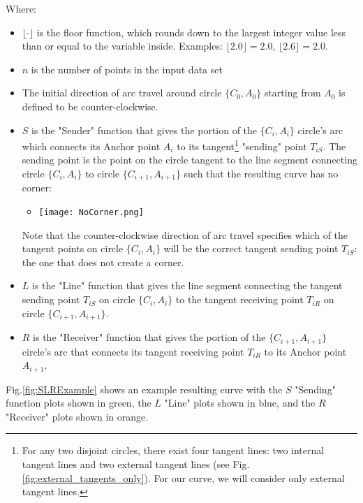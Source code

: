 \documentclass{article}
\begin{document}
Where:
\begin{itemize}
    \item $\lfloor \cdot \rfloor$ is the floor function, which rounds down to the largest integer value less than or equal to the variable inside. Examples: $\lfloor 2.0 \rfloor = 2.0$, $\lfloor 2.6 \rfloor = 2.0$.
    \item $n$ is the number of points in the input data set
    \item The initial direction of arc travel around circle $\{C_0, A_0\}$ starting from $A_0$ is defined to be counter-clockwise.
    \item $S$ is the "Sender" function that gives the portion of the $\{C_i, A_i\}$ circle's arc which connects its Anchor point $A_i$ to its tangent\footnote{For any two disjoint circles, there exist four tangent lines: two internal tangent lines and two external tangent lines (see Fig.     \ref{fig:external_tangents_only}). For our curve, we will consider only external tangent lines.} "sending" point $T_{iS}$. The sending point is the point on the circle tangent to the line segment connecting circle $\{C_i, A_i\}$ to circle $\{C_{i+1}, A_{i+1}\}$ such that the resulting curve has no corner:
    \begin{itemize}
        \item \texttt{[image: NoCorner.png]}
    \end{itemize}
    Note that the counter-clockwise direction of arc travel specifies which of the tangent points on circle $\{C_i, A_i\}$ will be the correct tangent sending point $T_{iS}$: the one that does not create a corner.
    \item $L$ is the "Line" function that gives the line segment connecting the tangent sending point $T_{iS}$ on circle $\{C_i, A_i\}$ to the tangent receiving point $T_{iR}$ on circle $\{C_{i+1}, A_{i+1}\}$.
    \item $R$ is the "Receiver" function that gives the portion of the $\{C_{i+1}, A_{i+1}\}$ circle's arc that connects its tangent receiving point $T_{iR}$ to its Anchor point $A_{i+1}$.
\end{itemize}
Fig.\ref{fig:SLRExample} shows an example resulting curve with the $S$ "Sending" function plots shown in green, the $L$ "Line" plots shown in blue, and the $R$ "Receiver" plots shown in orange.
\end{document}
